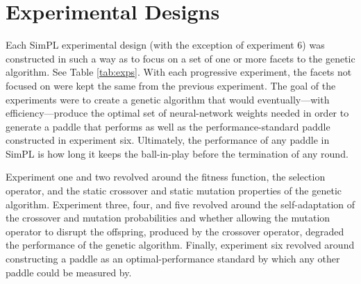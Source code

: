 \documentclass[a4paper,10pt]{article}
\begin{document}
\section{Experimental Designs}

Each SimPL experimental design (with the exception of experiment 6) was constructed in such a way as to focus on a set of one or more facets to the genetic algorithm. See Table \ref{tab:exps}. With each progressive experiment, the facets not focused on were kept the same from the previous experiment. The goal of the experiments were to create a genetic algorithm that would eventually---with efficiency---produce the optimal set of neural-network weights needed in order to generate a paddle that performs as well as the performance-standard paddle constructed in experiment six. Ultimately, the performance of any paddle in SimPL is how long it keeps the ball-in-play before the termination of any round.       

Experiment one and two revolved around the fitness function, the selection operator, and the static crossover and static mutation properties of the genetic algorithm. Experiment three, four, and five revolved around the self-adaptation of the crossover and mutation probabilities and whether allowing the mutation operator to disrupt the offspring, produced by the crossover operator, degraded the performance of the genetic algorithm. Finally, experiment six revolved around constructing a paddle as an optimal-performance standard by which any other paddle could be measured by.    

\renewcommand*\arraystretch{1.5}
\end{document}
